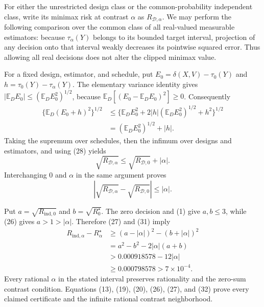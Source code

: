 For either the unrestricted design class or the common-probability independent class, write its minimax risk at contrast \(\alpha\) as \(R_{\mathcal D,\alpha}\).  We may perform the following comparison over the common class of all real-valued measurable estimators: because \(\tau_\alpha(Y)\) belongs to its bounded target interval, projection of any decision onto that interval weakly decreases its pointwise squared error.  Thus allowing all real decisions does not alter the clipped minimax value.

For a fixed design, estimator, and schedule, put \(E_0=\delta(X,V)-\tau_0(Y)\) and \(h=\tau_0(Y)-\tau_\alpha(Y)\).  The elementary variance identity gives \(|\mathbb E_D E_0|\le(\mathbb E_D E_0^2)^{1/2}\), because \(\mathbb E_D[(E_0-\mathbb E_D E_0)^2]\ge0\).  Consequently
\[
\begin{aligned}
\{\mathbb E_D(E_0+h)^2\}^{1/2}
&\le \{\mathbb E_D E_0^2
       +2|h|(\mathbb E_D E_0^2)^{1/2}+h^2\}^{1/2}\\
&=(\mathbb E_D E_0^2)^{1/2}+|h|.
\end{aligned}                                                               \tag{29}
\]
Taking the supremum over schedules, then the infimum over designs and estimators, and using (28) yields
\[
\sqrt{R_{\mathcal D,\alpha}}
\le\sqrt{R_{\mathcal D,0}}+|\alpha|.                                     \tag{30}
\]
Interchanging \(0\) and \(\alpha\) in the same argument proves
\[
\left|\sqrt{R_{\mathcal D,\alpha}}
      -\sqrt{R_{\mathcal D,0}}\right|\le|\alpha|.                        \tag{31}
\]

Put \(a=\sqrt{R_{\mathrm{ind},0}}\) and \(b=\sqrt{R^\star_0}\).  The zero decision and (1) give \(a,b\le3\), while (26) gives \(a>1>|\alpha|\).  Therefore (27) and (31) imply
\[
\begin{aligned}
R_{\mathrm{ind},\alpha}-R^\star_\alpha
&\ge(a-|\alpha|)^2-(b+|\alpha|)^2\\
&=a^2-b^2-2|\alpha|(a+b)\\
&>0.000918578-12|\alpha|\\
&\ge0.000798578>7\times10^{-4}.
\end{aligned}                                                               \tag{32}
\]
Every rational \(\alpha\) in the stated interval preserves rationality and the zero-sum contrast condition.  Equations (13), (19), (20), (26), (27), and (32) prove every claimed certificate and the infinite rational contrast neighborhood.

